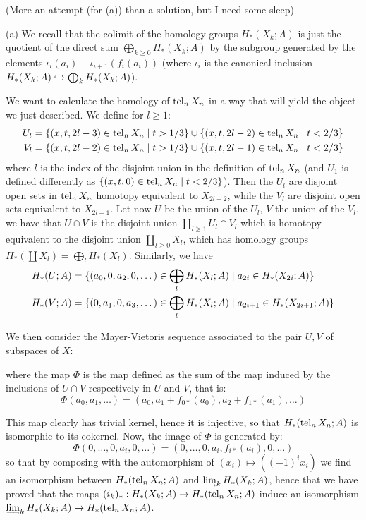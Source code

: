 \documentclass[a4paper,11pt,english]{article}
\begin{document}
\begin{exercise}[3](More an attempt (for (a)) than a solution, but I need some sleep)

(a) We recall that the colimit of the homology groups $H_*(X_k;A)$ is just the quotient of the direct sum $\bigoplus_{k\geq0}H_*(X_k;A)$ by the subgroup generated by the elements $\iota_i(a_i)-\iota_{i+1}(f_i(a_i))$ (where $\iota_i$ is the canonical inclusion $H_*(X_k;A)\hookrightarrow \bigoplus_k H_*(X_k;A)$).

We want to calculate the homology of $\operatorname{tel}_n X_n$ in a way that will yield the object we just described. We define for $l\geq 1$:
\begin{align*}
U_l&=\{(x,t,2l-3)\in\operatorname{tel}_n X_n\mid t>1/3\}\cup\{(x,t,2l-2)\in\operatorname{tel}_n X_n\mid t<2/3\} \\
V_l&=\{(x,t,2l-2)\in\operatorname{tel}_n X_n\mid t>1/3\}\cup\{(x,t,2l-1)\in\operatorname{tel}_n X_n\mid t<2/3\}
\end{align*}
where $l$ is the index of the disjoint union in the definition of $\operatorname{tel}_n X_n$ (and $U_1$ is defined differently as $\{(x,t,0)\in\operatorname{tel}_n X_n\mid t<2/3\}$). Then the $U_l$ are disjoint open sets in $\operatorname{tel}_n X_n$ homotopy equivalent to $X_{2l-2}$, while the $V_l$ are disjoint open sets equivalent to $X_{2l-1}$. Let now $U$ be the union of the $U_l$, $V$ the union of the $V_l$, we have that $U\cap V$ is the disjoint union $\coprod_{l\geq1}U_l\cap V_l$ which is homotopy equivalent to the disjoint union $\coprod_{l\geq0}X_l$, which has homology groups $H_*(\coprod X_l)=\bigoplus_l H_*(X_l)$. Similarly, we have
\begin{align*}
    H_*(U;A)&=\{(a_0,0,a_2,0,\dots)\in\bigoplus_l H_*(X_l;A)\mid a_{2i}\in H_*(X_{2i};A)\} \\
    H_*(V;A)&=\{(0,a_1,0,a_3,\dots)\in\bigoplus_l H_*(X_l;A)\mid a_{2i+1}\in H_*(X_{2i+1};A)\}
\end{align*}

We then consider the Mayer-Vietoris sequence associated to the pair $U,V$ of subspaces of $X$:
\begin{center}
\end{center}
where the map $\Phi$ is the map defined as the sum of the map induced by the inclusions of $U\cap V$ respectively in $U$ and $V$, that is:
\[\Phi(a_0,a_1,\dots)=(a_0,a_1+f_{0*}(a_0),a_2+f_{1*}(a_1),\dots)\]

This map clearly has trivial kernel, hence it is injective, so that $H_*(\operatorname{tel}_n X_n;A)$ is isomorphic to its cokernel. Now, the image of $\Phi$ is generated by:
\[\Phi(0,\dots,0,a_i,0,\dots)=(0,\dots,0,a_i,f_{i*}(a_i),0,\dots)\]
so that by composing with the automorphism of  $(x_i)\mapsto((-1)^ix_i)$ we find an isomorphism between $H_*(\operatorname{tel}_n X_n;A)$ and $\colim_k H_*(X_k;A)$, hence that we have proved that the maps $(i_k)_*:H_*(X_k;A)\to H_*(\operatorname{tel}_n X_n;A)$ induce an isomorphism $\colim_k H_*(X_k;A)\to H_*(\tel_n X_n;A)$.

\end{exercise}
\end{document}
